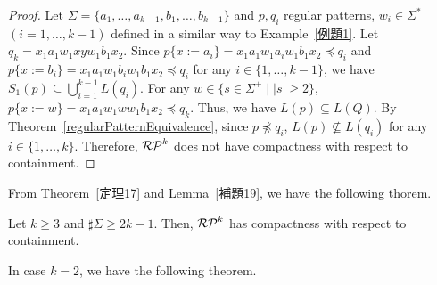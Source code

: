
\begin{proof}
    Let $\Sigma =\{a_{1},\ldots,a_{k-1},b_{1},\ldots,b_{k-1}\}$ and
    $p, q_{i}$ regular patterns, $w_{i} \in \Sigma^{\ast}$\ $(i=1,\ldots,k-1)$
    defined in a similar way to Example~\ref{例題1}.
    Let $q_{k}=x_{1}a_{1}w_{1}xyw_{1}b_{1}x_{2}$.
    Since
    $p\{x:=a_{i}\} = x_{1}a_{1}w_{1}a_{i}w_{1}b_{1}x_{2} \preceq q_{i}$ and
    $p\{x:=b_{i}\} = x_{1}a_{1}w_{1}b_{i}w_{1}b_{1}x_{2} \preceq q_{i}$
    for any $i \in \{1,\ldots,k-1\}$,
    we have $S_{1}(p) \subseteq \bigcup_{i=1}^{k-1}L(q_{i})$.
    For any $w \in \{s \in \Sigma^{+} \mid |s| \geq 2\}$,
    $p\{x:=w\}=x_{1}a_{1}w_{1}ww_{1}b_{1}x_{2} \preceq q_{k}$.
    Thus, we have $L(p) \subseteq L(Q)$.
    By Theorem~\ref{regularPatternEquivalence},
    since $p \not \preceq q_{i}$, $L(p) \not \subseteq L(q_{i})$
    for any $i \in \{1,\ldots, k\}$.
    Therefore, $\mathcal{RP}^{k}$ does not have compactness with respect to containment.
\end{proof}

From Theorem~\ref{定理17} and Lemma~\ref{補題19},
we have the following thorem.


\begin{thm}
    Let $k \geq 3$ and $\sharp\Sigma \geq 2k-1$.
    Then, $\mathcal{RP}^{k}$ has compactness with respect to containment.
\end{thm}

In case $k=2$, we have the following theorem.


